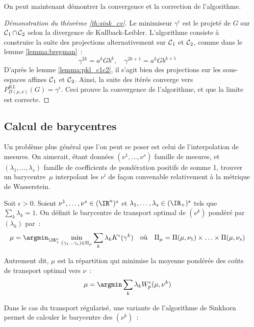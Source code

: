 On peut maintenant démontrer la convergence et la correction de l'algorithme.
\begin{proof}[Démonstration du théorème \ref{th:sink_cv}]
Le minimiseur $\gamma^\epsilon$ est le projeté de $G$ sur $\operatorname{\mathcal{C}}_1 \cap \operatorname{\mathcal{C}}_2$ selon la divergence de Kullback-Leibler. L'algorithme consiste à construire la suite des projections alternativement sur $\operatorname{\mathcal{C}}_1$ et $\operatorname{\mathcal{C}}_2$, comme dans le lemme \ref{lemma:bregman}~:
\[\gamma^{2k} = a^k G b^k,\quad \gamma^{2k+1} = a^k G b^{k+1}\]
D'après le lemme \ref{lemma:pkl_c1c2}, il s'agit bien des projections sur les sous-espaces affines $\operatorname{\mathcal{C}}_1$ et $\operatorname{\mathcal{C}}_2$.
 Ainsi, la suite des itérés converge vers $P^{KL}_{\Pi(\mu,\nu)}(G) = \gamma^\epsilon$. Ceci prouve la convergence de l'algorithme, et que la limite est correcte.
\end{proof}

\subsection{Calcul de barycentres}
Un problème plus général que l'on peut se poser est celui de l'interpolation de mesures. On aimerait, étant données $(\nu^1, \ldots, \nu^s)$ famille de mesures, et $(\lambda_1, \ldots, \lambda_s)$ famille de coefficients de pondération positifs de somme 1, trouver un \og barycentre \fg $\,\mu$ interpolant les $\nu^i$ de façon convenable relativement à la métrique de Wasserstein.

\begin{definition}
Soit $\epsilon > 0$. Soient $\nu^1, \ldots, \nu^s \in (\IR^{n})^s$ et $\lambda_1, \ldots, \lambda_s \in (\IR_+)^s$ tels que $\sum_k \lambda_k = 1$. On définit le barycentre de transport optimal de $(\nu^k)$ pondéré par $(\lambda_k)$ par~:
\[
\mu = \argmin_{\IR_{+}^{n}} \min_{(\gamma_1 \ldots \gamma_s) \in \Pi_\mu} \sum_k \lambda_k K^\epsilon(\gamma^k) 
\quad \text{où} \quad
\Pi_\mu = \Pi(\mu,\nu_1) \times \ldots \times \Pi(\mu,\nu_s)
\]
\end{definition}
Autrement dit, $\mu$ est la répartition qui minimise la moyenne pondérée des coûts de transport optimal vers $\nu$~:
\[ \mu = \argmin \sum_k \lambda_k W^\epsilon_p(\mu,\nu^k) \]

Dans le cas du transport régularisé, une variante de l'algorithme de Sinkhorn permet de calculer le barycentre des $(\nu^k)$~:

